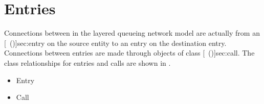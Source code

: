 % 
% 
\chapter{Entries}
\label{sec:entries}

Connections between  in the layered
queueing network model are actually from an
[~(\Sec\Ref)]{sec:entry} on the source entity to an
entry on the destination entry.  Connections between entries are made
through objects of class [~(\Sec\Ref)]{sec:call}.
The class relationships for entries and calls are shown in
.

\begin{figure}[htbp]
  \label{fig:entry}
  \begin{center}
  \end{center}
\end{figure}

\begin{iftex}
\begin{itemize}
\item Entry
\item Call
\end{itemize}
\end{iftex}



